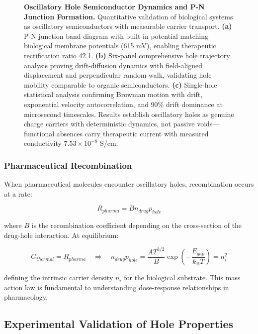 \documentclass{article}
\newcommand{\kB}{k_\mathrm{B}}
\theoremstyle{definition}
\theoremstyle{remark}
\begin{document}
\begin{figure}[htbp]
    \caption{\textbf{Oscillatory Hole Semiconductor Dynamics and P-N Junction Formation.} Quantitative validation of biological systems as oscillatory semiconductors with measurable carrier transport. \textbf{(a)} P-N junction band diagram with built-in potential matching biological membrane potentials (615 mV), enabling therapeutic rectification ratio 42.1. \textbf{(b)} Six-panel comprehensive hole trajectory analysis proving drift-diffusion dynamics with field-aligned displacement and perpendicular random walk, validating hole mobility comparable to organic semiconductors. \textbf{(c)} Single-hole statistical analysis confirming Brownian motion with drift, exponential velocity autocorrelation, and 90\% drift dominance at microsecond timescales. Results establish oscillatory holes as genuine charge carriers with deterministic dynamics, not passive voids—functional absences carry therapeutic current with measured conductivity $7.53\times10^{-8}$ S/cm.}
    \label{fig:semiconductor_dynamics_panel}
\end{figure}

\subsubsection{Pharmaceutical Recombination}

When pharmaceutical molecules encounter oscillatory holes, recombination occurs at a rate:

\begin{equation}
R_{pharma} = B n_{drug} p_{hole}
\label{eq:recombination_rate}
\end{equation}

where $B$ is the recombination coefficient depending on the cross-section of the drug-hole interaction. At equilibrium:

\begin{equation}
G_{thermal} = R_{pharma} \quad \Rightarrow \quad n_{drug} p_{hole} = \frac{AT^{3/2}}{B} \exp\left(-\frac{E_{gap}}{\kB T}\right) = n_i^2
\label{eq:mass_action}
\end{equation}

defining the intrinsic carrier density $n_i$ for the biological substrate. This mass action law is fundamental to understanding dose-response relationships in pharmacology.


\subsection{Experimental Validation of Hole Properties}
\end{document}
